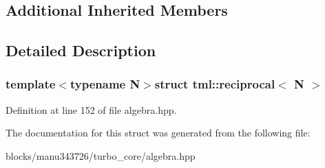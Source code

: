 \subsection*{Additional Inherited Members}


\subsection{Detailed Description}
\subsubsection*{template$<$typename N$>$struct tml\+::reciprocal$<$ N $>$}



Definition at line 152 of file algebra.\+hpp.



The documentation for this struct was generated from the following file\+:\begin{DoxyCompactItemize}
\item 
blocks/manu343726/turbo\+\_\+core/algebra.\+hpp\end{DoxyCompactItemize}
